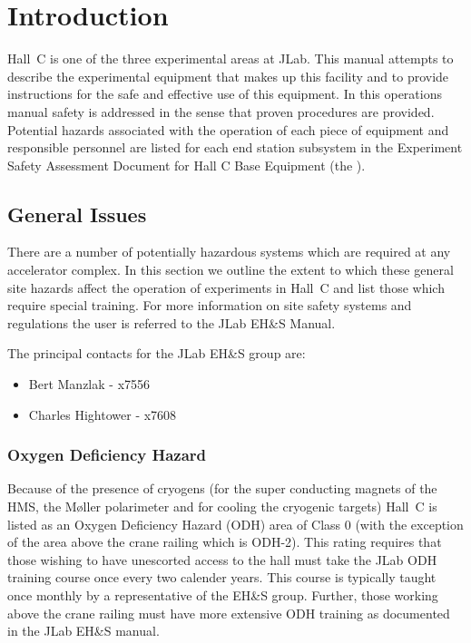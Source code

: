\chapter{Introduction}

Hall~C is one of the three experimental areas at JLab. This manual
attempts to describe the experimental equipment that makes up this facility
and to provide instructions for the safe and effective use of this equipment.
In this operations manual safety is addressed in the sense that proven
procedures are provided. Potential hazards associated with the operation
of each piece of equipment and responsible personnel are listed for each
end station subsystem in the Experiment Safety Assessment Document
for Hall C Base Equipment 
(the ).  

\section{General Issues}

There are a number of potentially hazardous systems which are required
at any accelerator complex.
In this section we outline the extent to which these general site hazards
affect the operation of experiments in Hall~C and list those which
require special training. For more information on site safety systems
and regulations the user is referred to the JLab EH\&S Manual.

The principal contacts for the JLab EH\&S group are:

\begin{itemize}
\item[~]Bert Manzlak  - x7556
\item[~]Charles Hightower - x7608
\end{itemize}

\subsection{Oxygen Deficiency Hazard}

Because of the presence of cryogens (for the super conducting magnets
of the HMS, the M\o ller polarimeter and for cooling the cryogenic
targets) Hall~C is listed as an Oxygen Deficiency Hazard (ODH) area of
Class 0 (with the exception of the area above the crane railing which
is ODH-2).  This rating requires that those wishing to have unescorted
access to the hall must take the JLab ODH training course once every
two calender years. This course is typically taught once monthly by a
representative of the EH\&S group.  Further, those working above the
crane railing must have more extensive ODH training as documented in
the JLab EH\&S manual.

